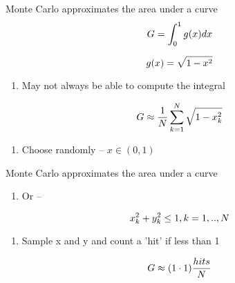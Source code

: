\documentclass[aspectratio=1610,pdftex,dvipsnames,compress,xcolor={dvipsnames}]{beamer}
\begin{document}
\addtocounter{framenumber}{-1} 
\begin{frame}{Monte Carlo approximates the area under a curve}
    \begin{equation}
        \LARGE
        G = \int_0^1 g(x)dx
    \end{equation}

    \begin{equation}
        \LARGE
        g(x) = \sqrt{1-x^2}
    \end{equation}

    \vspace*{\fill}

    \begin{enumerate}[series=outerlist,topsep=0pt,itemsep=21pt,leftmargin=*,label=(\arabic*)]
        \item[]May not always be able to compute the integral
    \end{enumerate}

    \vspace*{\fill}

    \begin{equation}
        \LARGE
        G \approx \frac{1}{N} \sum_{k=1}^{N} \sqrt{1-x_k^2}
    \end{equation}

    \vspace*{\fill}

    \begin{enumerate}[series=outerlist,topsep=0pt,itemsep=21pt,leftmargin=*,label=(\arabic*)]
        \item[]Choose randomly -- $x \in (0,1)$
    \end{enumerate}
\end{frame}


\begin{frame}{Monte Carlo approximates the area under a curve}
    \begin{enumerate}[series=outerlist,topsep=0pt,itemsep=21pt,leftmargin=*,label=(\arabic*)]
        \item[]Or --
    \end{enumerate}

    \vspace*{\fill}

    \begin{equation}
        \LARGE
        x_k^2+y_k^2 \leq 1, k = 1,..,N
    \end{equation}

    \vspace*{\fill}

    \begin{enumerate}[series=outerlist,topsep=0pt,itemsep=11pt,leftmargin=*,label=(\arabic*)]
        \item[]Sample x and y and count a 'hit' if less than 1
    \end{enumerate}

    \vspace*{\fill}

    \begin{equation}
        \LARGE
        G \approx (1 \cdot 1)\frac{hits}{N}
    \end{equation}
\end{frame}
\end{document}
